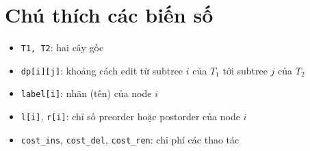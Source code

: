 \documentclass[12pt]{article}
\begin{document}
\section*{Chú thích các biến số}
\begin{itemize}
    \item \texttt{T1, T2}: hai cây gốc
    \item \texttt{dp[i][j]}: khoảng cách edit từ subtree $i$ của $T_1$ tới subtree $j$ của $T_2$
    \item \texttt{label[i]}: nhãn (tên) của node $i$
    \item \texttt{l[i]}, \texttt{r[i]}: chỉ số preorder hoặc postorder của node $i$
    \item \texttt{cost\_ins}, \texttt{cost\_del}, \texttt{cost\_ren}: chi phí các thao tác
\end{itemize}
\end{document}
